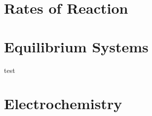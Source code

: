 \documentclass[12pt]{article}
\begin{document}
    \section{Rates of Reaction}
    
    \section{Equilibrium Systems}
    test
    \section{Electrochemistry}
    
\end{document}
